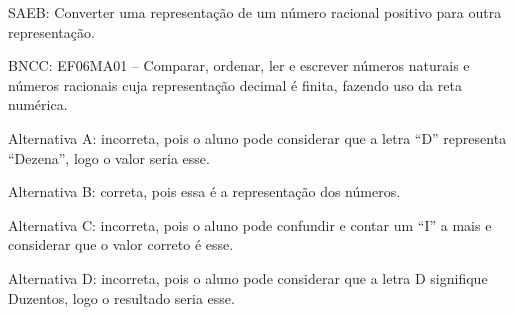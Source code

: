 \begin{enumerate}
	SAEB: Converter uma representação de um número racional positivo para
outra representação.

BNCC: EF06MA01 -- Comparar, ordenar, ler e escrever números naturais e
números racionais cuja representação decimal é finita, fazendo uso da
reta numérica.

Alternativa A: incorreta, pois o aluno pode considerar que a letra ``D''
representa ``Dezena'', logo o valor seria esse.

Alternativa B: correta, pois essa é a representação dos números.

Alternativa C: incorreta, pois o aluno pode confundir e contar um ``I''
a mais e considerar que o valor correto é esse.

Alternativa D: incorreta, pois o aluno pode considerar que a letra D
signifique Duzentos, logo o resultado seria esse.

	\end{enumerate}


